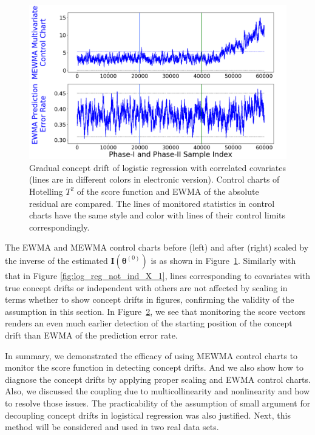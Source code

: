 \documentclass[twoside,11pt]{article}
\begin{document}
\begin{enumerate}[(I)]
\begin{figure}[!htbp]
  \label{fig:log_reg_not_ind_X_grad_cd}
\end{figure}
\begin{figure}[!htbp]
\centering
\includegraphics[width = 0.6\linewidth]{../figures/v14/sim_7/logi_small/1_sim7_logi_1e-08_0_005_1.png}
  \caption{Gradual concept drift of logistic regression with correlated covariates (lines are in different colors in electronic version). Control charts of Hotelling $T^2$ of the score function and EWMA of the absolute residual are compared. The lines of monitored statistics in control charts have the same style and color with lines of their control limits correspondingly.}
  \label{fig:log_reg_ind_X_grad_cd_comp}
\end{figure}

The EWMA and MEWMA control charts before (left) and after (right) scaled by {the inverse of the estimated} ${\mathbf {I}}(\bm { \theta}^{(0)})$ is as shown in Figure~\ref{fig:log_reg_not_ind_X_grad_cd}. Similarly with that in Figure \ref{fig:log_reg_not_ind_X_1}, lines corresponding to covariates with true concept drifts or independent with others are not affected by scaling in terms whether to show concept drifts in figures, confirming the validity of the assumption in this section. In Figure~\ref{fig:log_reg_ind_X_grad_cd_comp}, we see that monitoring the score vectors renders an even much earlier detection of the starting position of the concept drift than EWMA of the prediction error rate.

In summary, we demonstrated the efficacy of using MEWMA control charts to monitor the score function in detecting concept drifts. And we also show how to diagnose the concept drifts by applying proper scaling and EWMA control charts. Also, we discussed the coupling due to multicollinearity and nonlinearity and how to resolve those issues. The practicability of the assumption of small argument for decoupling concept drifts in logistical regression was also justified. Next, this method will be considered and used in two real data sets.
\end{enumerate}
\end{document}
